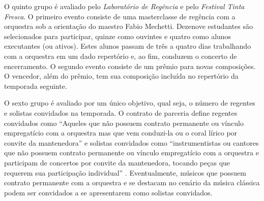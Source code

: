 \documentclass[a4paper, 12pt, openright, oneside, german, french, english, brazil]{abntex2}
\begin{document}
	O quinto grupo é avaliado pelo \textit{Laboratório de Regência} e pelo \textit{Festival Tinta Fresca}. O primeiro evento consiste de uma masterclasse de regência com a orquestra sob a orientação do maestro Fabio Mechetti. Dezenove estudantes são selecionados para participar, quinze como ouvintes e quatro como alunos executantes (ou ativos). Estes alunos passam de três a quatro dias trabalhando com a orquestra em um dado repertório e, ao fim, conduzem o concerto de encerramento. O segundo evento consiste de um prêmio para novas composições. O vencedor, além do prêmio, tem sua composição incluída no repertório da temporada seguinte.
	
	
	O sexto grupo é avaliado por um único objetivo, qual seja, o número de regentes e solistas convidados na temporada. O contrato de parceria define regentes convidados como ``Aqueles que não possuem contrato permanente ou vínculo empregatício com a orquestra mas que vem conduzi-la ou o coral lírico por convite da mantenedora'' \cite[p. 40]{minas2017aditivo} e solistas convidados como ``instrumentistas ou cantores que não possuem contrato permanente ou vínculo empregatício com a orquestra e participam de concertos por convite da mantenedora, tocando peças que requerem sua participação individual''  \cite[p. 40]{minas2017aditivo}. Eventualmente, músicos que possuem contrato permanente com a orquestra e se destacam no cenário da música clássica podem ser convidados a se apresentarem como solistas convidados.
	
	
\end{document}

